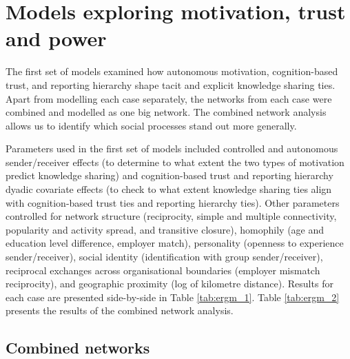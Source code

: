 \section{Models exploring motivation, trust and power}

The first set of models examined how autonomous motivation, cognition-based trust, and reporting hierarchy shape tacit and explicit knowledge sharing ties. Apart from modelling each case separately, the networks from each case were combined and modelled as one big network. The combined network analysis allows us to identify which social processes stand out more generally.  \medskip

Parameters used in the first set of models included controlled and autonomous sender/receiver effects (to determine to what extent the two types of motivation predict knowledge sharing) and cognition-based trust and reporting hierarchy dyadic covariate effects (to check to what extent knowledge sharing ties align with cognition-based trust ties and reporting hierarchy ties). Other parameters controlled for network structure (reciprocity, simple and multiple connectivity, popularity and activity spread, and transitive closure), homophily (age and education level difference, employer match), personality (openness to experience sender/receiver), social identity (identification with group sender/receiver), reciprocal exchanges across organisational boundaries (employer mismatch reciprocity), and geographic proximity (log of kilometre distance). Results for each case are presented side-by-side in Table \ref{tab:ergm_1}. Table \ref{tab:ergm_2} presents the results of the combined network analysis. \medskip

\subsection{Combined networks}

